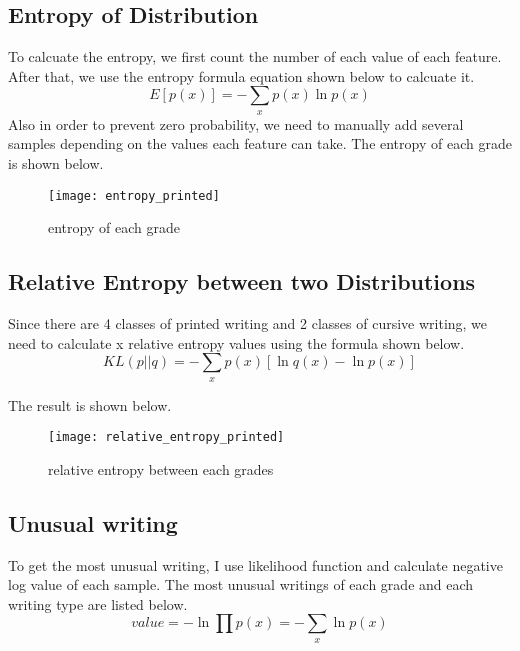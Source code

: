 \documentclass{article}
\begin{document}
\subsection{Entropy of Distribution}
To calcuate the entropy, we first count the number of each value of each feature.
After that, we use the entropy formula equation shown below to calcuate it.
\begin{equation}
	\label{entropy}
	E[p(x)]=-\sum_{x}p(x)\ln p(x)
\end{equation}
Also in order to prevent zero probability, we need to manually add
several samples depending on the values each feature can take.
The entropy of each grade is shown below.

\begin{figure}[ht]
		\vskip 0.1in
		\begin{center}
				\texttt{[image: entropy\_printed]}
				\caption{entropy of each grade}
		\end{center}
		\vskip -0.1in
\end{figure}

\subsection{Relative Entropy between two Distributions}
Since there are 4 classes of printed writing and 2 classes of cursive writing, we
need to calculate x relative entropy values using the formula shown below.
\begin{equation}
	KL(p||q)=-\sum_{x}p(x)[\ln q(x) - \ln p(x)]
\end{equation}

The result is shown below.
\begin{figure}[ht]
		\vskip 0.1in
		\begin{center}
				\texttt{[image: relative\_entropy\_printed]}
				\caption{relative entropy between each grades}
		\end{center}
		\vskip -0.1in
\end{figure}

\subsection{Unusual writing}
To get the most unusual writing, I use likelihood function and calculate negative log value
of each sample. The most unusual writings of each grade and each writing type are listed below.
\begin{equation}
		value=-\ln {\prod p(x)}
		=-\sum_{x}\ln {p(x)}
\end{equation}
\end{document}
